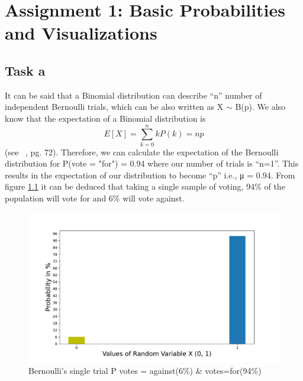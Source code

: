 \chapter{Assignment 1: Basic Probabilities and Visualizations}

\section{Task a}

It can be said that a Binomial distribution can describe “n” number of independent Bernoulli trials, which can be also written as X ${\sim}$  B(p). We also know that the expectation of a Binomial distribution is \begin{equation}  E [X] = \sum_{k=0}^{n}kP(k)= np \label{task1_a} \end{equation} (see ~\cite{Iubh:2021}, pg. 72). \newline
Therefore, we can calculate the expectation of the Bernoulli distribution for P(vote = "for") = 0.94 where our number of trials is “n=1”. This results in the expectation of our distribution to become “p” i.e., μ = 0.94. From figure \ref{fig:task_1_a} it can be deduced that taking a single sample of voting, 94\% of the population will vote for and 6\% will vote against.

\begin{figure}[h!]
\centering
\includegraphics[width=\textwidth]{pics/task_1_a.pdf}
\caption{Bernoulli’s single trial P votes = against(6\%) \& votes=for(94\%)}\label{fig:task_1_a}
\end{figure}
\FloatBarrier 

